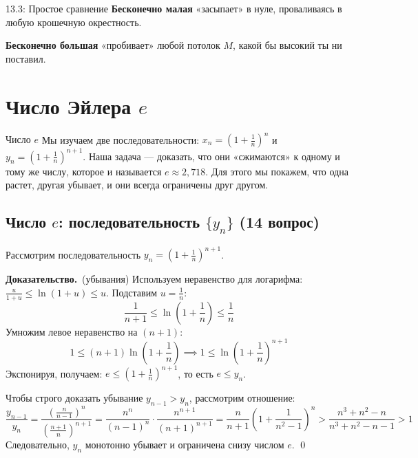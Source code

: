 \documentclass[a4paper,12pt]{article}
\newcommand{\myproof}{\textbf{Доказательство.}\ }
\begin{document}
	\vspace{0.5cm}
	\begin{notebook}{13.3: Простое сравнение}
		\textbf{Бесконечно малая} «засыпает» в нуле, проваливаясь в любую крошечную окрестность.
		
		\vspace{0.5cm}
		\textbf{Бесконечно большая} «пробивает» любой потолок $M$, какой бы высокий ты ни поставил.
	\end{notebook}
	
	
	
	
	
	
	
	\newpage
	\section{Число Эйлера $e$}
	
	\begin{notebook}{Число $e$}
		Мы изучаем две последовательности: $x_n = (1 + \frac{1}{n})^n$ и $y_n = (1 + \frac{1}{n})^{n+1}$. Наша задача — доказать, что они «сжимаются» к одному и тому же числу, которое и называется $e \approx 2{,}718$. Для этого мы покажем, что одна растет, другая убывает, и они всегда ограничены друг другом.
	\end{notebook}
	
	\subsection{Число $e$: последовательность $\{y_n\}$ (14 вопрос)}
	
	Рассмотрим последовательность $y_n = \left(1 + \frac{1}{n}\right)^{n+1}$.
	
	\vspace{0.5cm}
	\myproof (убывания)
	Используем неравенство для логарифма: $\frac{u}{1+u} \le \ln(1+u) \le u$.
	Подставим $u = \frac{1}{n}$:
	\[ \frac{1}{n+1} \le \ln\left(1 + \frac{1}{n}\right) \le \frac{1}{n} \]
	Умножим левое неравенство на $(n+1)$:
	\[ 1 \le (n+1) \ln\left(1 + \frac{1}{n}\right) \implies 1 \le \ln\left(1 + \frac{1}{n}\right)^{n+1} \]
	Экспонируя, получаем: $e \le \left(1 + \frac{1}{n}\right)^{n+1}$, то есть $e \le y_n$.
	
	Чтобы строго доказать убывание $y_{n-1} > y_n$, рассмотрим отношение:
	\[ \frac{y_{n-1}}{y_n} = \frac{\left(\frac{n}{n-1}\right)^n}{\left(\frac{n+1}{n}\right)^{n+1}} = \frac{n^n}{(n-1)^n} \cdot \frac{n^{n+1}}{(n+1)^{n+1}} = \frac{n}{n+1} \left(1 + \frac{1}{n^2-1}\right)^n > \frac{n^3 + n^2 - n}{n^3 + n^2 - n - 1} > 1 \]
	Следовательно, $y_n$ монотонно убывает и ограничена снизу числом $e$. \qed
	
\end{document}
